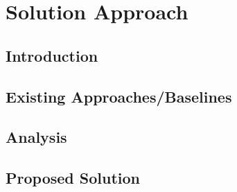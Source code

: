 
\chapter{Solution Approach} %
\label{Chapter3}


\section{Introduction}
 

\section{Existing Approaches/Baselines}
\section{Analysis}
\section{Proposed Solution}